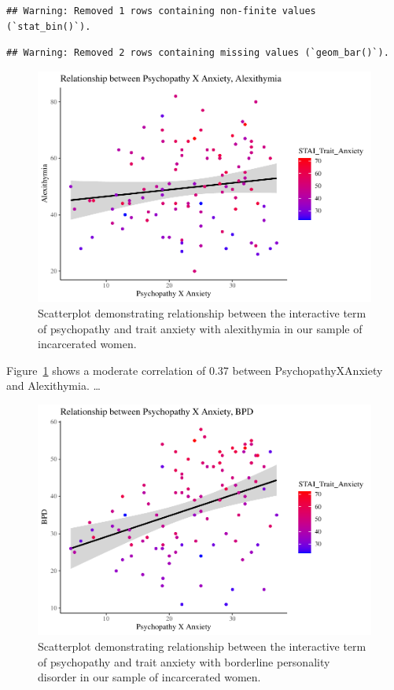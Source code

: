 \documentclass[
  man,floatsintext]{apa7}
\begin{document}
\begin{verbatim}
## Warning: Removed 1 rows containing non-finite values (`stat_bin()`).
\end{verbatim}

\begin{verbatim}
## Warning: Removed 2 rows containing missing values (`geom_bar()`).
\end{verbatim}



\begin{figure}
\includegraphics[width=1\linewidth]{d2m-Psychopathy_files/figure-latex/c-path-scatterplot-1} \caption{Scatterplot demonstrating relationship between the interactive term of psychopathy and trait anxiety with alexithymia in our sample of incarcerated women.}\label{fig:c-path-scatterplot}
\end{figure}

Figure~\ref{fig:c-path-scatterplot} shows a moderate correlation of 0.37 between PsychopathyXAnxiety and Alexithymia. \ldots{}



\begin{figure}
\includegraphics[width=1\linewidth]{d2m-Psychopathy_files/figure-latex/a-path-scatterplot-1} \caption{Scatterplot demonstrating relationship between the interactive term of psychopathy and trait anxiety with borderline personality disorder in our sample of incarcerated women.}\label{fig:a-path-scatterplot}
\end{figure}
\end{document}
